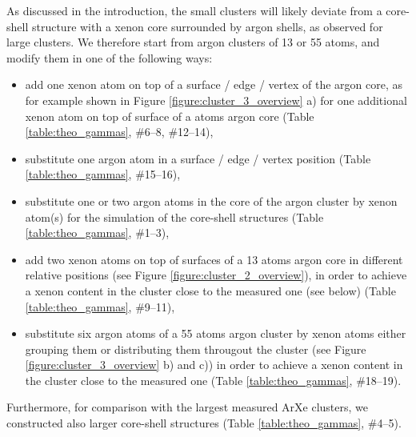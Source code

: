 As discussed in the introduction, the small clusters will likely
deviate from a core-shell structure with a xenon core surrounded
by argon shells, as observed for large clusters.\cite{tchaplyguinearxe,Vach_1999} We therefore start from
argon clusters of 13 or 55 atoms, and modify them in one of the following
ways:
%
\begin{itemize}
 \item add one xenon atom on top of a surface / edge / vertex of
       the argon core, as for example shown in
       Figure \ref{figure:cluster_3_overview} a)
       for one additional xenon atom
       on top of surface of a \unit[55]{atoms} argon core
       (Table \ref{table:theo_gammas}, \#6--8, \#12--14),
 \item substitute one argon atom in a surface / edge / vertex position
       (Table \ref{table:theo_gammas}, \#15--16),
 \item substitute one or two argon atoms in the core of the argon cluster
       by xenon atom(s) for the simulation of the core-shell structures
       (Table \ref{table:theo_gammas}, \#1--3),
 \item add two xenon atoms on top of surfaces of a 13 atoms argon core
       in different relative positions (see Figure
       \ref{figure:cluster_2_overview}),
       in order to achieve a xenon content in the cluster close to the
       measured one (see below)
       (Table \ref{table:theo_gammas}, \#9--11),
 \item substitute six argon atoms of a 55 atoms argon cluster by xenon
       atoms either grouping them or distributing them througout the cluster
       (see Figure \ref{figure:cluster_3_overview} b) and c)) in order to
       achieve a xenon content in the cluster close to the measured one
       (Table \ref{table:theo_gammas}, \#18--19).
\end{itemize}
%
Furthermore, for comparison with the largest measured ArXe clusters, we constructed also larger core-shell structures (Table \ref{table:theo_gammas}, \#4--5).
